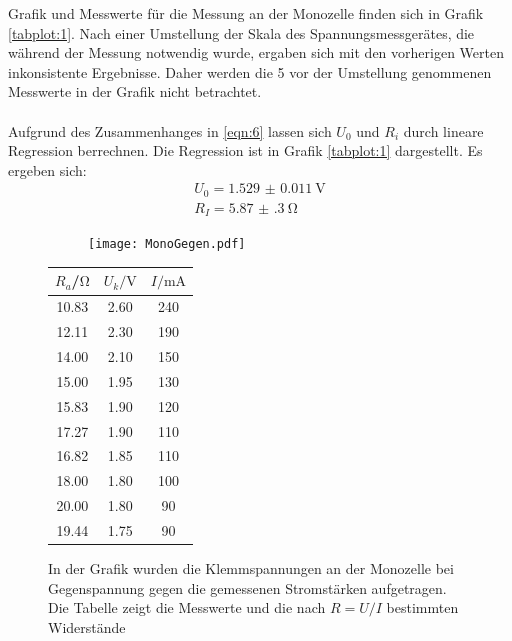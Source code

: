 Grafik und Messwerte für die Messung an der Monozelle finden sich in Grafik \ref{tabplot:1}. Nach einer
Umstellung der Skala des Spannungsmessgerätes, die während der Messung notwendig wurde, ergaben sich
mit den vorherigen Werten inkonsistente Ergebnisse. Daher werden die 5 vor der Umstellung genommenen Messwerte
in der Grafik nicht betrachtet.\\
\\
Aufgrund des Zusammenhanges in \eqref{eqn:6} lassen sich $U_0$ und $R_i$ durch lineare Regression berrechnen.
Die Regression ist in Grafik \ref{tabplot:1} dargestellt. Es ergeben sich:
\begin{equation*}
  \begin{split}
    U_0 = \SI{1.529(11)}{\volt}\\
    R_I = \SI{5.87(30)}{\ohm}
  \end{split}
\end{equation*}
\newpage
\begin{figure}[h]
  \begin{subfigure}{0.74\textwidth}
  \centering
    \texttt{[image: MonoGegen.pdf]}
    \label{sub:3}
    \qquad
  \end{subfigure}
  \begin{subtable}{0.25\textwidth}
  \centering
    \begin{tabular}{c c c}
    \toprule
    $R_a$/$\si{\ohm}$ & $U_{k}/\si{\volt}$ & $I/\si{\milli\ampere}$ \\
    \midrule
    10.83 & 2.60 & 240 \\
    12.11 & 2.30 & 190 \\
    14.00 & 2.10 & 150 \\
    15.00 & 1.95 & 130 \\
    15.83 & 1.90 & 120 \\
    17.27 & 1.90 & 110 \\
    16.82 & 1.85 & 110 \\
    18.00 & 1.80 & 100 \\
    20.00 & 1.80 & 90 \\
    19.44 & 1.75 & 90 \\
    \bottomrule
    \end{tabular}
    \label{sub:4}
    \qquad
  \end{subtable}
  \caption{In der Grafik wurden die Klemmspannungen an der Monozelle bei Gegenspannung
  gegen die gemessenen Stromstärken aufgetragen. Die Tabelle zeigt die Messwerte und die
   nach $R = U/I$ bestimmten Widerstände}
  \label{tabplot:2}
\end{figure}

